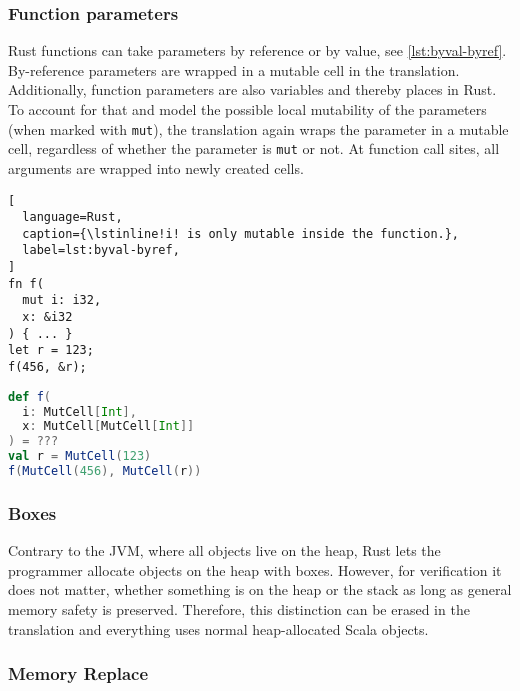 \subsubsection{Function parameters}

Rust functions can take parameters by reference or by value, see
\autoref{lst:byval-byref}. By-reference parameters are wrapped in a mutable cell
in the translation. Additionally, function parameters are also variables and
thereby places in Rust. To account for that and model the possible local
mutability of the parameters (when marked with \lstinline!mut!), the translation
again wraps the parameter in a mutable cell, regardless of whether the parameter
is \lstinline!mut! or not. At function call sites, all arguments are wrapped
into newly created cells.

\noindent\begin{minipage}[t]{.48\textwidth}
\begin{lstlisting}[
  language=Rust,
  caption={\lstinline!i! is only mutable inside the function.},
  label=lst:byval-byref,
]
fn f(
  mut i: i32,
  x: &i32
) { ... }
let r = 123;
f(456, &r);
\end{lstlisting}
\end{minipage}\hfill
\begin{minipage}[t]{.48\textwidth}
\begin{lstlisting}[language=Scala, caption={This results in nested cell in Scala.}]
def f(
  i: MutCell[Int],
  x: MutCell[MutCell[Int]]
) = ???
val r = MutCell(123)
f(MutCell(456), MutCell(r))
\end{lstlisting}
\end{minipage}

\subsubsection{Boxes}

Contrary to the JVM, where all objects live on the heap, Rust lets the
programmer allocate objects on the heap with boxes. However, for verification it
does not matter, whether something is on the heap or the stack as long as
general memory safety is preserved. Therefore, this distinction can be erased in
the translation and everything uses normal heap-allocated Scala objects.

\subsubsection{Memory Replace}

